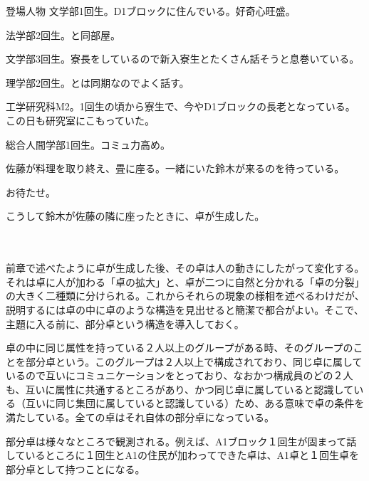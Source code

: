 \begin{multicols}{2}
\begin{itembox}[l]{登場人物}
  文学部1回生。D1ブロックに住んでいる。好奇心旺盛。
  
  法学部2回生。と同部屋。

  文学部3回生。寮長をしているので新入寮生とたくさん話そうと息巻いている。

  理学部2回生。とは同期なのでよく話す。

  工学研究科M2。1回生の頃から寮生で、今やD1ブロックの長老となっている。この日も研究室にこもっていた。

  総合人間学部1回生。コミュ力高め。
  
\end{itembox}
佐藤が料理を取り終え、畳に座る。一緒にいた鈴木が来るのを待っている。
\par
{}
お待たせ。

こうして鈴木が佐藤の隣に座ったときに、卓が生成した。
\par
\dotfill

\\

\\
前章で述べたように卓が生成した後、その卓は人の動きにしたがって変化する。それは卓に人が加わる「卓の拡大」と、卓が二つに自然と分かれる「卓の分裂」の大きく二種類に分けられる。これからそれらの現象の様相を述べるわけだが、説明するには卓の中に卓のような構造を見出せると簡潔で都合がよい。そこで、主題に入る前に、部分卓という構造を導入しておく。
\par
卓の中に同じ属性を持っている２人以上のグループがある時、そのグループのことを部分卓という。このグループは２人以上で構成されており、同じ卓に属しているので互いにコミュニケーションをとっており、なおかつ構成員のどの２人も、互いに属性に共通するところがあり、かつ同じ卓に属していると認識している（互いに同じ集団に属していると認識している）ため、ある意味で卓の条件を満たしている。全ての卓はそれ自体の部分卓になっている。
\par
部分卓は様々なところで観測される。例えば、A1ブロック１回生が固まって話しているところに１回生とA1の住民が加わってできた卓は、A1卓と１回生卓を部分卓として持つことになる。


\end{multicols}
